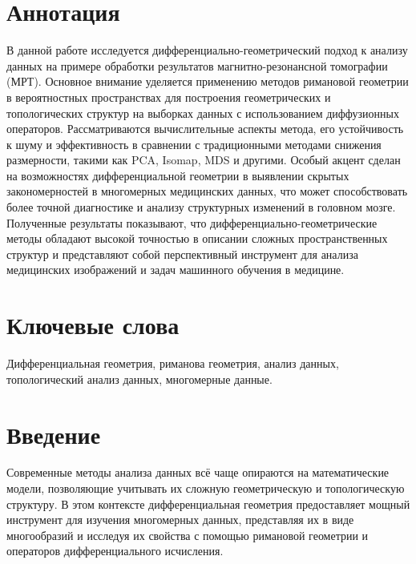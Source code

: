 \documentclass[a4paper,12pt]{extarticle}
\begin{document}
\newpage
\setcounter{page}{2}

{
	\hypersetup{linkcolor=black}
	\tableofcontents
}

\newpage

\newpage
\section*{Аннотация}   %
В данной работе исследуется дифференциально-геометрический подход к анализу данных на примере обработки результатов магнитно-резонансной томографии (МРТ). Основное внимание уделяется применению методов римановой геометрии в вероятностных пространствах для построения геометрических и топологических структур на выборках данных с использованием диффузионных операторов.
Рассматриваются вычислительные аспекты метода, его устойчивость к шуму и эффективность в сравнении с традиционными методами снижения размерности, такими как PCA, Isomap, MDS и другими. Особый акцент сделан на возможностях дифференциальной геометрии в выявлении скрытых закономерностей в многомерных медицинских данных, что может способствовать более точной диагностике и анализу структурных изменений в головном мозге.
Полученные результаты показывают, что дифференциально-геометрические методы обладают высокой точностью в описании сложных пространственных структур и представляют собой перспективный инструмент для анализа медицинских изображений и задач машинного обучения в медицине.

\section*{Ключевые слова}
Дифференциальная геометрия, риманова геометрия, анализ данных, топологический анализ данных, многомерные данные.
\pagebreak

\section{Введение}   %

Современные методы анализа данных всё чаще опираются на математические модели, позволяющие учитывать их сложную геометрическую и топологическую структуру. В этом контексте дифференциальная геометрия предоставляет мощный инструмент для изучения многомерных данных, представляя их в виде многообразий и исследуя их свойства с помощью римановой геометрии и операторов дифференциального исчисления.
\end{document}
